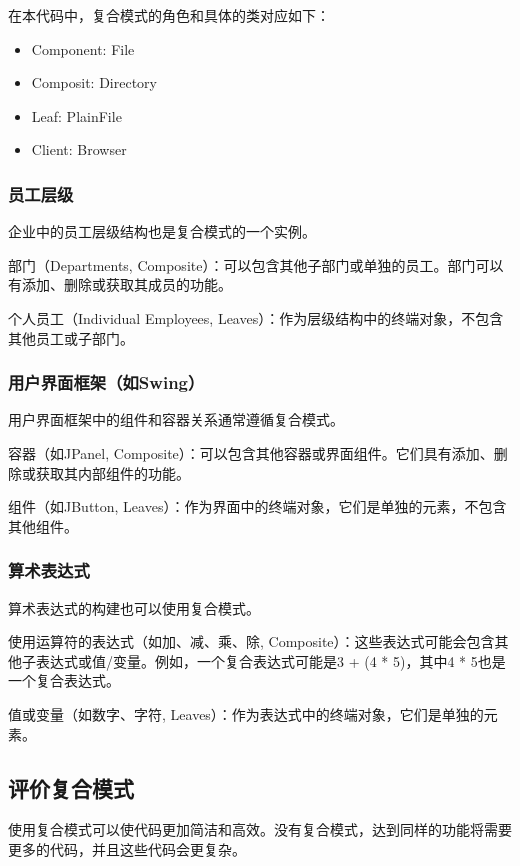 在本代码中，复合模式的角色和具体的类对应如下：
\begin{itemize}
	\item Component: File
	\item Composit: Directory
	\item Leaf: PlainFile
	\item Client: Browser
\end{itemize}

\subsubsection{员工层级}
企业中的员工层级结构也是复合模式的一个实例。

部门（Departments, Composite）：可以包含其他子部门或单独的员工。部门可以有添加、删除或获取其成员的功能。

个人员工（Individual Employees, Leaves）：作为层级结构中的终端对象，不包含其他员工或子部门。

\subsubsection{用户界面框架（如Swing）}

用户界面框架中的组件和容器关系通常遵循复合模式。

容器（如JPanel, Composite）：可以包含其他容器或界面组件。它们具有添加、删除或获取其内部组件的功能。

组件（如JButton, Leaves）：作为界面中的终端对象，它们是单独的元素，不包含其他组件。

\subsubsection{算术表达式}

算术表达式的构建也可以使用复合模式。

使用运算符的表达式（如加、减、乘、除, Composite）：这些表达式可能会包含其他子表达式或值/变量。例如，一个复合表达式可能是3 + (4 * 5)，其中4 * 5也是一个复合表达式。

值或变量（如数字、字符, Leaves）：作为表达式中的终端对象，它们是单独的元素。

\subsection{评价复合模式}

使用复合模式可以使代码更加简洁和高效。没有复合模式，达到同样的功能将需要更多的代码，并且这些代码会更复杂。

